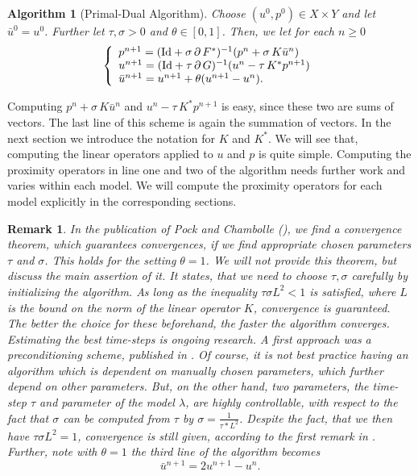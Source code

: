 \documentclass{scrreprt}
\newtheorem{remark}[theorem]{Remark}
\newtheorem{algorithm}[theorem]{Algorithm}
\begin{document}
        \begin{algorithm}[Primal-Dual Algorithm]
        \label{alg:primal_dual_algorithm}
            Choose $(u^{0}, p^{0}) \in X \times Y$ and let $\bar{u}^{0} = u^{0}$. Further let $\tau, \sigma > 0$ and $\theta \in [0, 1]$. Then, we let for each $n \ge 0$
                $$
                    \left\{ 
                        \begin{array}{l l}
                            p^{n+1} = (\textnormal{Id} + \sigma\,\partial\,F^{\ast})^{-1}(p^{n} + \sigma\,K\bar{u}^{n}) \\
                            u^{n+1} = (\textnormal{Id} + \tau\,\partial\,G)^{-1}(u^{n} - \tau\,K^{\ast}p^{n+1}) \\
                            \bar{u}^{n+1} = u^{n+1} + \theta (u^{n+1} - u^{n}).
                        \end{array}
                    \right.
                $$
        \end{algorithm}

        Computing $p^{n} + \sigma\,K\bar{u}^{n}$ and $u^{n} - \tau\,K^{\ast}p^{n+1}$ is easy, since these two are sums of vectors. The last line of this scheme is again the summation of vectors. In the next section we introduce the notation for $K$ and $K^{\ast}$. We will see that, computing the linear operators applied to $u$ and $p$ is quite simple. Computing the proximity operators in line one and two of the algorithm needs further work and varies within each model. We will compute the proximity operators for each model explicitly in the corresponding sections.

        \begin{remark}
            In the publication of Pock and Chambolle (\cite{Chambolle10afirst-order}), we find a convergence theorem, which guarantees convergences, if we find appropriate chosen parameters $\tau$ and $\sigma$. This holds for the setting $\theta = 1$. We will not provide this theorem, but discuss the main assertion of it. It states, that we need to choose $\tau, \sigma$ carefully by initializing the algorithm. As long as the inequality $\tau\sigma L^{2} < 1$ is satisfied, where $L$ is the bound on the norm of the linear operator $K$, convergence is guaranteed. The better the choice for these beforehand, the faster the algorithm converges. Estimating the best time-steps is ongoing research. A first approach was a preconditioning scheme, published in \cite{Pock2011}. Of course, it is not best practice having an algorithm which is dependent on manually chosen parameters, which further depend on other parameters. But, on the other hand, two parameters, the time-step $\tau$ and parameter of the model $\lambda$, are highly controllable, with respect to the fact that $\sigma$ can be computed from $\tau$ by $\sigma = \frac{1}{\tau * L^{2}}$. Despite the fact, that we then have $\tau\sigma L^{2} = 1$, convergence is still given, according to the first remark in \cite{Chambolle10afirst-order}. Further, note with $\theta = 1$ the third line of the algorithm becomes
                $$
                    \bar{u}^{n+1} = 2u^{n+1} - u^{n}.
                $$
        \end{remark}
\end{document}
